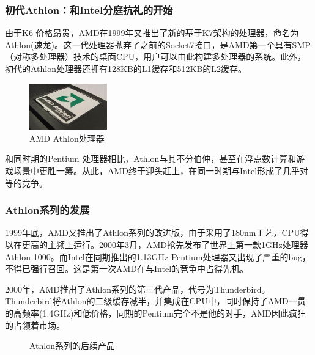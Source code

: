 \documentclass[UTF8]{ctexart}
\begin{document}
\subsubsection{初代Athlon：和Intel分庭抗礼的开始}
由于K6-\uppercase\expandafter{}价格昂贵，AMD在1999年又推出了新的基于K7架构的处理器，命名为Athlon(速龙)。这一代处理器抛弃了之前的Socket7接口，是AMD第一个具有SMP（对称多处理器）技术的桌面CPU，用户可以由此构建多处理器的系统。此外，初代的Athlon处理器还拥有128KB的L1缓存和512KB的L2缓存。
\begin{figure}[H]
    \begin{center}
        \includegraphics[width=0.3\textwidth]{figure/athlon.jpg}
        \caption{AMD Athlon处理器}
    \end{center}
\end{figure}
和同时期的Pentium \uppercase\expandafter{}处理器相比，Athlon与其不分伯仲，甚至在浮点数计算和游戏场景中更胜一筹。从此，AMD终于迎头赶上，在同一时期与Intel形成了几乎对等的竞争。
\subsubsection{Athlon系列的发展}
1999年底，AMD又推出了Athlon系列的改进版，由于采用了180nm工艺，CPU得以在更高的主频上运行。2000年3月，AMD抢先发布了世界上第一款1GHz处理器Athlon 1000。而Intel在同期推出的1.13GHz Pentium\uppercase\expandafter{}处理器又出现了严重的bug，不得已强行召回。这是第一次AMD在与Intel的竞争中占得先机。

2000年，AMD推出了Athlon系列的第三代产品，代号为Thunderbird。Thunderbird将Athlon的二级缓存减半，并集成在CPU中，同时保持了AMD一贯的高频率(1.4GHz)和低价格，同期的Pentium\uppercase\expandafter{}完全不是他的对手，AMD因此疯狂的占领着市场。
\begin{figure}[H]
    \centering
    \caption{Athlon系列的后续产品}
\end{figure}
\end{document}
